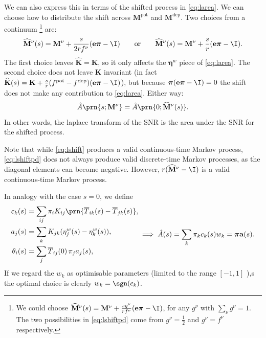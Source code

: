 \documentclass[12pt]{article}
\newcommand{\onev}{\mathbf{e}}
\newcommand{\eqm}{\pi}
\newcommand{\eq}{\boldsymbol{\eqm}}
\newcommand{\fptm}{T}
\newcommand{\fptbm}{\overline{\fptm}}
\newcommand{\etwm}{\eta^w}
\newcommand{\etw}{\boldsymbol{\eta}^w}
\newcommand{\thbm}{\theta}
\newcommand{\wm}{w}
\newcommand{\w}{\mathbf{\wm}}
\newcommand{\MMdm}{M}
\newcommand{\MMd}{\mathbf{\MMdm}}
\newcommand{\encm}{K}
\newcommand{\enc}{\mathbf{\encm}}
\newcommand{\pot}{^{\text{pot}}}
\newcommand{\dep}{^{\text{dep}}}
\newcommand{\shift}[1]{\widehat{#1}}
\begin{document}
We can also express this in terms of the shifted process in \cref{eq:larea}.
We can choose how to distribute the shift across \(\MMd \pot\) and \(\MMd \dep\).
Two choices from a continuum%
\footnote{We could choose \( \shift{\MMd}^\nu(s) = \MMd^\nu + \frac{s g^\nu}{r f^\nu} (\onev \eq - \I) \), for any \(g^\nu \) with \( \sum_\nu g^\nu = 1 \).
The two possibilities in \cref{eq:lshiftpd} come from \(g^\nu = \frac{1}{2}\) and \(g^\nu = f^\nu\) respectively.}
are:
%
\begin{equation}\label{eq:lshiftpd}
  \shift{\MMd}^\nu(s) = \MMd^\nu + \frac{s}{2 r f^\nu} (\onev \eq - \I)
  \qquad \text{or} \qquad
  \shift{\MMd}^\nu(s) = \MMd^\nu + \frac{s}{r} (\onev \eq - \I).
\end{equation}
%
The first choice leaves \( \shift{\enc} = \enc \), so it only affects the \(\etw\) piece of \cref{eq:larea}.
The second choice does not leave \(\enc\) invariant (in fact \( \shift{\enc}(s) = \enc + \frac{s}{r} (f\pot - f\dep) (\onev \eq - \I) \)), but because \( \eq (\onev \eq - \I) = 0 \) the shift does not make any contribution to \cref{eq:larea}.
Either way:
%
\begin{equation}\label{eq:lareashift}
  \hat{A}\prn{s; \MMd^\nu} = \hat{A}\prn{0; \shift{\MMd}^\nu(s)}.
\end{equation}
%
In other words, the laplace transform of the SNR is the area under the SNR for the shifted process.

Note that while \cref{eq:lshift} produces a valid continuous-time Markov process, \cref{eq:lshiftpd} does not always produce valid discrete-time Markov processes, as the diagonal elements can become negative.
However, \(r (\shift{\MMd}^\nu - \I)\) is a valid continuous-time Markov process.

In analogy with the case \(s=0\), we define
%
\begin{equation}\label{eq:lareacoeffs}
  \begin{aligned}
    {c}_k(s) &= \sum_{ij} \eqm_i \encm_{ij} \prn{\fptbm_{ik}(s)-\fptbm_{jk}(s)}, \\
    {a}_j(s) &= \sum_{k} \encm_{jk} (\etwm_{j}(s) - \etwm_{k}(s)), \\
    \thbm_i(s) &= \sum_j \fptbm_{ij}(0)\, \eqm_j {a}_j(s), \\
  \end{aligned}
    \implies
    \hat{A}(s) 
      = \sum_k \eqm_k {c}_k(s) \wm_k
      = \eq \mathbf{a}(s).
\end{equation}
%
If we regard the \(\wm_k\) as optimisable parameters (limited to the range \( [-1,1] \) \wlg),s the optimal choice is clearly \( \wm_k = \sgn(c_k) \).
\end{document}
